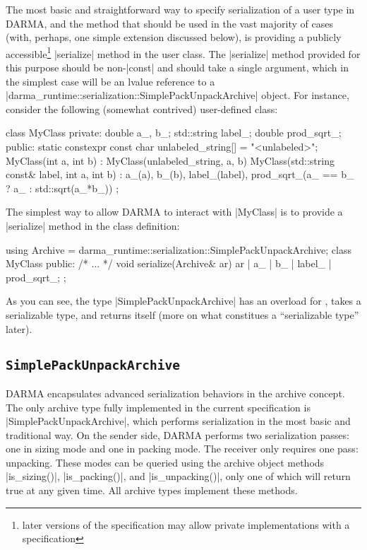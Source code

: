 The most basic and straightforward way to specify serialization of a user type
in \gls{DARMA}, and the method that should be used in the vast majority of cases
(with, perhaps, one simple extension discussed below), is providing a publicly
accessible\footnote{later versions of the specification may allow private
implementations with a  specification} |serialize| method
in the user class.  The |serialize| method provided for this purpose should be
non-|const| and should take a single argument, which in the simplest case will
be an lvalue reference to a
|darma_runtime::serialization::SimplePackUnpackArchive| object.  For instance,
consider the following (somewhat contrived) user-defined class:
%
\begin{CppCodeNumb}
class MyClass {
  private:
    double a_, b_;
    std::string label_;
    double prod_sqrt_;
  public:
    static constexpr const char unlabeled_string[] = "<unlabeled>";
    MyClass(int a, int b)
      : MyClass(unlabeled_string, a, b)
    { }
    MyClass(std::string const& label, int a, int b)
      : a_(a), b_(b), label_(label),
        prod_sqrt_(a_ == b_ ? a_ : std::sqrt(a_*b_))
    { }
};
\end{CppCodeNumb}
%
The simplest way to allow \gls{DARMA} to interact with |MyClass| is to provide
a |serialize| method in the class definition:
\begin{CppCodeNumb}
using Archive = darma_runtime::serialization::SimplePackUnpackArchive;
class MyClass {
  public:
    /* ... */
    void serialize(Archive& ar) {
      ar | a_ | b_ | label_ | prod_sqrt_;
    }
};
\end{CppCodeNumb}
As you can see, the type |SimplePackUnpackArchive| has an overload for
, takes a serializable type, and returns itself (more
on what constitues a ``serializable type'' later).

\subsection{\texttt{SimplePackUnpackArchive}}

\gls{DARMA} encapsulates advanced serialization behaviors in the \gls{archive}
\gls{concept}.  The only \gls{archive} type fully implemented in the current
specification is |SimplePackUnpackArchive|, which performs serialization in the
most basic and traditional way.  On the sender side, \gls{DARMA} performs
two serialization passes: one in sizing mode and one in packing mode.  The receiver
only requires one pass: unpacking.  These modes can be queried using the archive
object methods |is_sizing()|, |is_packing()|, and |is_unpacking()|, only
one of which will return true at any given time.  All \gls{archive} types
implement these methods.


